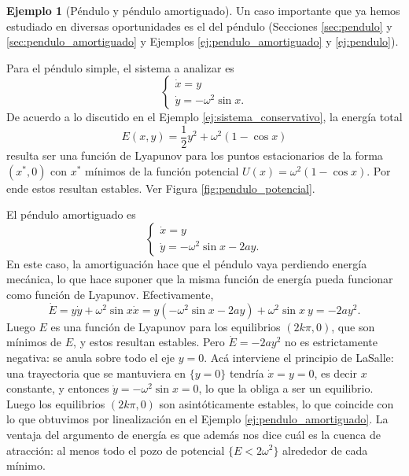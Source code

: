 \documentclass[12pt, a4paper]{amsbook}
\theoremstyle{remark}
\theoremstyle{definition}
\newtheorem{ejem}[teo]{Ejemplo}
\numberwithin{section}{chapter}
\numberwithin{subsection}{section}
\numberwithin{equation}{section}
\numberwithin{figure}{chapter}
\begin{document}
\begin{ejem}[Péndulo y péndulo amortiguado]
Un caso importante que ya hemos estudiado en diversas oportunidades es el del péndulo (Secciones \ref{sec:pendulo} y \ref{sec:pendulo_amortiguado} y Ejemplos \ref{ej:pendulo_amortiguado} y \ref{ej:pendulo}). 

Para el péndulo simple, el sistema a analizar es
$$
\begin{cases}
\dot x = y\\
\dot y = -\omega^2\sin x.
\end{cases}
$$
De acuerdo a lo discutido en el Ejemplo \ref{ej:sistema_conservativo}, la energía total 
$$
E(x, y) = \frac12 y^2 + \omega^2(1-\cos x)
$$
resulta ser una función de Lyapunov para los puntos estacionarios de la forma $(x^*, 0)$ con $x^*$ mínimos de la función potencial $U(x) = \omega^2(1-\cos x)$. Por ende estos resultan estables. Ver Figura \ref{fig:pendulo_potencial}.

El péndulo amortiguado es
$$
\begin{cases}
\dot x = y\\
\dot y = -\omega^2\sin x - 2a y.
\end{cases}
$$
En este caso, la amortiguación hace que el péndulo vaya perdiendo energía mecánica, lo que hace suponer que la misma función de energía pueda funcionar como función de Lyapunov. Efectivamente,
$$
\dot E = y \dot y + \omega^2\sin x\dot x = y(-\omega^2\sin x - 2a y) + \omega^2 \sin x\ y = -2ay^2.
$$
Luego $E$ es una función de Lyapunov para los equilibrios $(2k\pi,0)$, que son mínimos de $E$, y estos resultan estables. Pero $\dot E = -2ay^2$ no es estrictamente negativa: se anula sobre todo el eje $y=0$. Acá interviene el principio de LaSalle: una trayectoria que se mantuviera en $\{y=0\}$ tendría $\dot x = y = 0$, es decir $x$ constante, y entonces $\dot y = -\omega^2\sin x = 0$, lo que la obliga a ser un equilibrio. Luego los equilibrios $(2k\pi,0)$ son asintóticamente estables, lo que coincide con lo que obtuvimos por linealización en el Ejemplo \ref{ej:pendulo_amortiguado}. La ventaja del argumento de energía es que además nos dice cuál es la cuenca de atracción: al menos todo el pozo de potencial $\{E<2\omega^2\}$ alrededor de cada mínimo.
\end{ejem}
\end{document}
